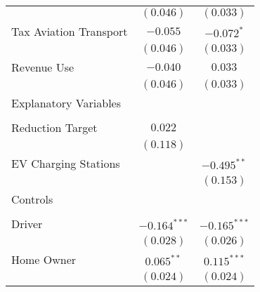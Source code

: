 \begin{center}
\begin{tiny}
\begin{longtable}{l@{} c@{} c@{}}
                                                                           & $(0.046)$        & $(0.033)$        \\
\quad Tax Aviation Transport                                               & $-0.055$         & $-0.072^{*}$     \\
                                                                           & $(0.046)$        & $(0.033)$        \\
\quad Revenue Use                                                          & $-0.040$         & $0.033$          \\
                                                                           & $(0.046)$        & $(0.033)$        \\
Explanatory Variables                                                      &                  &                  \\
                                                                           &                  &                  \\
\quad Reduction Target                                                     & $0.022$          &                  \\
                                                                           & $(0.118)$        &                  \\
\quad EV Charging Stations                                                 &                  & $-0.495^{**}$    \\
                                                                           &                  & $(0.153)$        \\
Controls                                                                   &                  &                  \\
                                                                           &                  &                  \\
\quad Driver                                                               & $-0.164^{***}$   & $-0.165^{***}$   \\
                                                                           & $(0.028)$        & $(0.026)$        \\
\quad Home Owner                                                           & $0.065^{**}$     & $0.115^{***}$    \\
                                                                           & $(0.024)$        & $(0.024)$        \\

\end{longtable}
\end{tiny}
\end{center}
